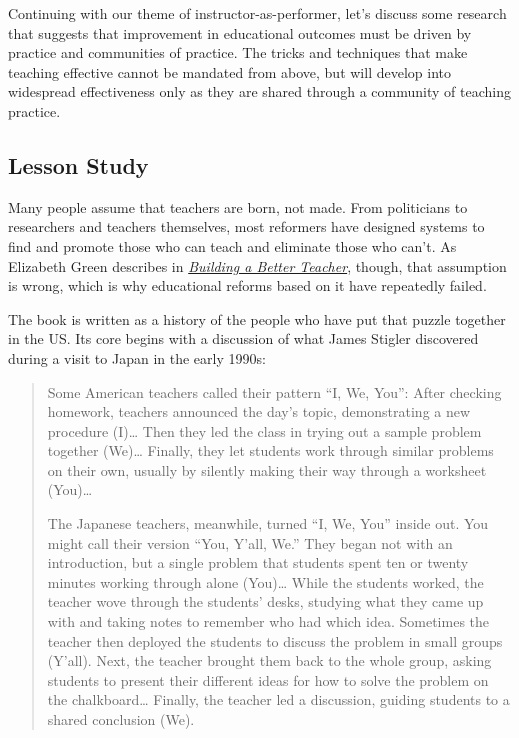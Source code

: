 
Continuing with our theme of instructor-as-performer, let's discuss some
research that suggests that improvement in educational outcomes must be
driven by practice and communities of practice. The tricks and
techniques that make teaching effective cannot be mandated from above,
but will develop into widespread effectiveness only as they are shared
through a community of teaching practice.

\subsection{Lesson Study}\label{lesson-study}

Many people assume that teachers are born, not made. From politicians to
researchers and teachers themselves, most reformers have designed
systems to find and promote those who can teach and eliminate those who
can't. As Elizabeth Green describes in
\emph{\href{http://www.amazon.com/Building-Better-Teacher-Teaching-Everyone/dp/0393081591/}{Building
a Better Teacher}}, though, that assumption is wrong, which is why
educational reforms based on it have repeatedly failed.

The book is written as a history of the people who have put that puzzle
together in the US. Its core begins with a discussion of what James
Stigler discovered during a visit to Japan in the early 1990s:

\begin{quote}
Some American teachers called their pattern ``I, We, You'': After
checking homework, teachers announced the day's topic, demonstrating a
new procedure (I)\ldots{} Then they led the class in trying out a sample
problem together (We)\ldots{} Finally, they let students work through
similar problems on their own, usually by silently making their way
through a worksheet (You)\ldots{}

The Japanese teachers, meanwhile, turned ``I, We, You'' inside out. You
might call their version ``You, Y'all, We.'' They began not with an
introduction, but a single problem that students spent ten or twenty
minutes working through alone (You)\ldots{} While the students worked,
the teacher wove through the students' desks, studying what they came up
with and taking notes to remember who had which idea. Sometimes the
teacher then deployed the students to discuss the problem in small
groups (Y'all). Next, the teacher brought them back to the whole group,
asking students to present their different ideas for how to solve the
problem on the chalkboard\ldots{} Finally, the teacher led a discussion,
guiding students to a shared conclusion (We).
\end{quote}

